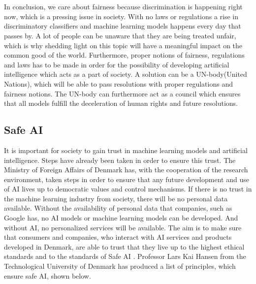\documentclass[11pt, fleqn, titlepage]{article}
\begin{document}
	\\\\
	In conclusion, we care about fairness because discrimination is happening right now, which is a pressing issue in society. With no laws or regulations a rise in discriminatory classifiers and machine learning models happens every day that passes by. A lot of people can be unaware that they are being treated unfair, which is why shedding light on this topic will have a meaningful impact on the common good of the world. Furthermore, proper notions of fairness, regulations and laws has to be made in order for the possibility of developing artificial intelligence which acts as a part of society. A solution can be a UN-body(United Nations), which will be able to pass resolutions with proper regulations and fairness notions. The UN-body can furthermore act as a council which ensures that all models fulfill the deceleration of human rights and future resolutions. 
	
	
	
	
	\subsection{Safe AI}\label{safeai}
	It is important for society to gain trust in machine learning models and artificial intelligence. Steps have already been taken in order to ensure this trust. The Ministry of Foreign Affairs of Denmark has, with the cooperation of the research environment, taken steps in order to ensure that any future development and use of AI lives up to democratic values and control mechanisms. If there is no trust in the machine learning industry from society, there will be no personal data available. Without the availability of personal data that companies, such as Google has, no AI models or machine learning models can be developed. And without AI, no personalized services will be available. The aim is to make sure that consumers and companies, who interact with AI services and products developed in Denmark, are able to trust that they live up to the highest ethical standards and to the standards of Safe AI \cite{larsk}. Professor Lars Kai Hansen from the Technological University of Denmark has produced a list of principles, which ensure safe AI, shown  below. 
	
\end{document}
